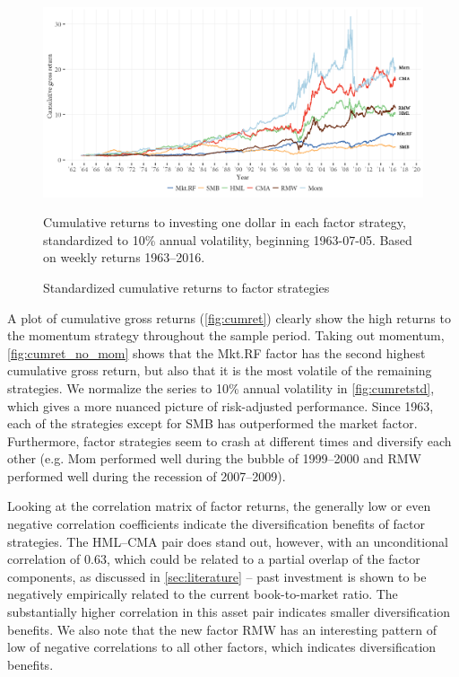 \begin{figure}[htbp]
  \centering
  \includegraphics[scale=1]{graphics/cumretStdPlot.png}  
  \footnotesize
  \caption{Standardized cumulative returns to factor strategies}
  \begin{longcaption}
    Cumulative returns to investing one dollar in each factor strategy, standardized to 10\% annual volatility, beginning 1963-07-05. Based on weekly returns 1963--2016.
  \end{longcaption}
  \label{fig:cumretstd}
\end{figure}

A plot of cumulative gross returns (\autoref{fig:cumret}) clearly show the high returns to the momentum strategy throughout the sample period. Taking out momentum, \autoref{fig:cumret_no_mom} shows that the Mkt.RF factor has the second highest cumulative gross return, but also that it is the most volatile of the remaining strategies. We normalize the series to 10\% annual volatility in \autoref{fig:cumretstd}, which gives a more nuanced picture of risk-adjusted performance. Since 1963, each of the strategies except for SMB has outperformed the market factor. Furthermore, factor strategies seem to crash at different times and diversify each other (e.g. Mom performed well during the bubble of 1999--2000 and RMW performed well during the recession of 2007--2009).

Looking at the correlation matrix of factor returns, the generally low or even negative correlation coefficients indicate the diversification benefits of factor strategies. The HML--CMA pair does stand out, however, with an unconditional correlation of 0.63, which could be related to a partial overlap of the factor components, as discussed in \autoref{sec:literature} -- past investment is shown to be negatively empirically related to the current book-to-market ratio. The substantially higher correlation in this asset pair indicates smaller diversification benefits. We also note that the new factor RMW has an interesting pattern of low of negative correlations to all other factors, which indicates diversification benefits.
\FloatBarrier


